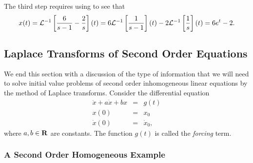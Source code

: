 The third step requires using  to see that
\[
x(t) = {\cal L}^{-1}\left[\frac{6}{s-1} - \frac{2}{s}\right](t) = 
6{\cal L}^{-1}\left[\frac{1}{s-1}\right](t) -
2{\cal L}^{-1}\left[\frac{1}{s}\right](t) = 6e^t-2.
\]


\subsection*{Laplace Transforms of Second Order Equations}

We end this section with a discussion of the type of information that
we will need to solve initial value problems of second order inhomogeneous 
 linear equations by the method of Laplace transforms. 
Consider the differential equation
\begin{equation}  \label{e:2ndforced}
\begin{array}{rcl} 
\ddot{x} + a\dot{x} + bx & = & g(t)\\
x(0) & = & x_0\\
\dot{x}(0) & = & \dot{x}_0,
\end{array}
\end{equation}
where $a,b\in\mbox{$\bf{R}$}$ are constants.  The function $g(t)$ is called the 
{\em forcing\/} term. 

\subsubsection*{A Second Order Homogeneous Example}

